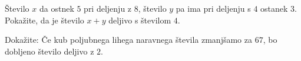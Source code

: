 \documentclass[addpoints]{exam}
\begin{document}
\begin{questions}
    
\newpage

    \question[3]
    Število $x$ da ostnek $5$ pri deljenju z $8$, število $y$ pa ima pri deljenju s $4$ ostanek $3$. 
    Pokažite, da je število $x+y$ deljivo s številom $4$.

    
    \begin{solution}[7cm]

    \end{solution}

    \question[4]
        Dokažite: Če kub poljubnega lihega naravnega števila zmanjšamo za $67$, bo dobljeno število deljivo z $2$.
        

    \begin{solution}[3cm]

    \end{solution}





\end{questions}
\end{document}
